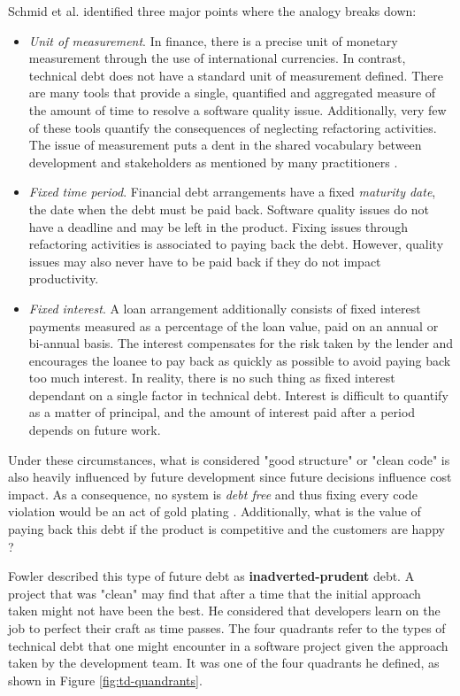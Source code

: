 \documentclass{mprop}
\begin{document}
Schmid et al. \cite{Schmid2013} identified three major points where the analogy
breaks down:
\begin{itemize}
	\item \textit{Unit of measurement}. In finance, there is a precise unit of
	      monetary measurement through the use of international currencies. In
	      contrast, technical debt does not have a standard unit of measurement
	      defined. There are many tools \cite{Fontana2016} that provide a
	      single, quantified and aggregated measure of the amount of time to
	      resolve a software quality issue. Additionally, very few of these
	      tools quantify the consequences of neglecting refactoring activities.
	      The issue of measurement puts a dent in the shared vocabulary between
	      development and stakeholders as mentioned by many practitioners
	      \cite{Lim2012} \cite{Codabux2013}.
	\item \textit{Fixed time period}. Financial debt arrangements have a fixed
	      \textit{maturity date}, the date when the debt must be paid back.
	      Software quality issues do not have a deadline and may be left in the
	      product. Fixing issues through refactoring activities is associated to
	      paying back the debt. However, quality issues may also never have to
	      be paid back if they do not impact productivity.
	\item \textit{Fixed interest}. A loan arrangement additionally consists of
	      fixed interest payments measured as a percentage of the loan value,
	      paid on an annual or bi-annual basis. The interest compensates for the
	      risk taken by the lender and encourages the loanee to pay back as
	      quickly as possible to avoid paying back too much interest. In
	      reality, there is no such thing as fixed interest dependant on a
	      single factor in technical debt. Interest is difficult to quantify as
	      a matter of principal, and the amount of interest paid after a period
	      depends on future work.
\end{itemize}
Under these circumstances, what is considered "good structure" or "clean code"
is also heavily influenced by future development since future decisions
influence cost impact. As a consequence, no system is \textit{debt free} and
thus fixing every code violation would be an act of gold plating
\cite{Kruchten2012}. Additionally, what is the value of paying back this debt if
the product is competitive and the customers are happy \cite{Lim2012}?

Fowler \cite{TDMartin} described this type of future debt as
\textbf{inadverted-prudent} debt. A project that was "clean" may find that after
a time that the initial approach taken might not have been the best. He
considered that developers learn on the job to perfect their craft as time
passes. The four quadrants refer to the types of technical debt that one might
encounter in a software project given the approach taken by the development
team. It was one of the four quadrants he defined, as shown in Figure
\ref{fig:td-quandrants}.
\end{document}
